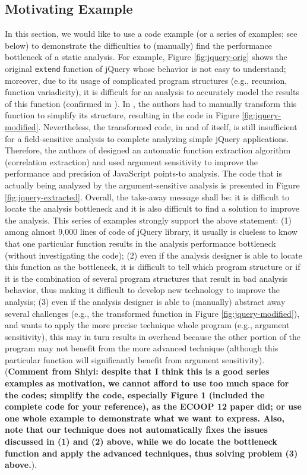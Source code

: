 \documentclass[a4paper,UKenglish]{lipics}
\begin{document}
\subsection{Motivating Example}
In this section, we would like to use a code example (or a series of examples; see below) to demonstrate the difficulties to (manually) find the performance bottleneck of a static analysis. For example, Figure \ref{fig:jquery-orig} shows the original {\tt extend} function of jQuery whose behavior is not easy to understand; moreover, due to its usage of complicated program structures (e.g., recursion, function variadicity), it is difficult for an analysis to accurately model the results of this function (confirmed in \cite{}). In \cite{}, the authors had to manually transform this function to simplify its structure, resulting in the code in Figure \ref{fig:jquery-modified}. Nevertheless, the transformed code, in and of itself, is still insufficient for a field-sensitive analysis to complete analyzing simple jQuery applications. Therefore, the authors of \cite{} designed an automatic function extraction algorithm (correlation extraction) and used argument sensitivity to improve the performance and precision of JavaScript points-to analysis. The code that is actually being analyzed by the argument-sensitive analysis is presented in Figure \ref{fig:jquery-extracted}. Overall, the take-away message shall be: it is difficult to locate the analysis bottleneck and it is also difficult to find a solution to improve the analysis. This series of examples strongly support the above statement: (1) among almost 9,000 lines of code of jQuery library, it usually is clueless to know that one particular function results in the analysis performance bottleneck (without investigating the code); (2) even if the analysis designer is able to locate this function as the bottleneck, it is difficult to tell which program structure or if it is the combination of several program structures that result in bad analysis behavior, thus making it difficult to develop new technology to improve the analysis; (3) even if the analysis designer is able to (manually) abstract away several challenges (e.g., the transformed function in Figure \ref{fig:jquery-modified}), and wants to apply the more precise technique whole program (e.g., argument sensitivity), this may in turn results in overhead because the other portion of the program may not benefit from the more advanced technique (although this particular function will significantly benefit from argument sensitivity). ({\bf Comment from Shiyi: despite that I think this is a good series examples as motivation, we cannot afford to use too much space for the codes; simplify the code, especially Figure 1 (included the complete code for your reference), as the ECOOP 12 paper did; or use one whole example to demonstrate what we want to express. Also, note that our technique does not automatically fixes the issues discussed in (1) and (2) above, while we do locate the bottleneck function and apply the advanced techniques, thus solving problem (3) above.}).
\end{document}
